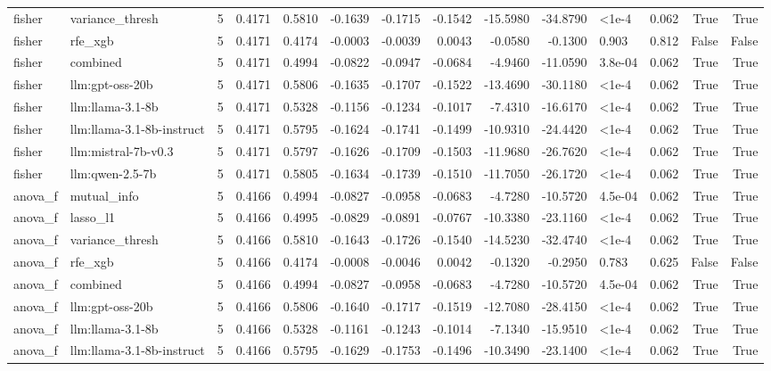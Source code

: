 \begin{tabular}{llrrrrrrrrllrr}
fisher & variance_thresh & 5 & 0.4171 & 0.5810 & -0.1639 & -0.1715 & -0.1542 & -15.5980 & -34.8790 & <1e-4 & 0.062 & True & True \\
fisher & rfe_xgb & 5 & 0.4171 & 0.4174 & -0.0003 & -0.0039 & 0.0043 & -0.0580 & -0.1300 & 0.903 & 0.812 & False & False \\
fisher & combined & 5 & 0.4171 & 0.4994 & -0.0822 & -0.0947 & -0.0684 & -4.9460 & -11.0590 & 3.8e-04 & 0.062 & True & True \\
fisher & llm:gpt-oss-20b & 5 & 0.4171 & 0.5806 & -0.1635 & -0.1707 & -0.1522 & -13.4690 & -30.1180 & <1e-4 & 0.062 & True & True \\
fisher & llm:llama-3.1-8b & 5 & 0.4171 & 0.5328 & -0.1156 & -0.1234 & -0.1017 & -7.4310 & -16.6170 & <1e-4 & 0.062 & True & True \\
fisher & llm:llama-3.1-8b-instruct & 5 & 0.4171 & 0.5795 & -0.1624 & -0.1741 & -0.1499 & -10.9310 & -24.4420 & <1e-4 & 0.062 & True & True \\
fisher & llm:mistral-7b-v0.3 & 5 & 0.4171 & 0.5797 & -0.1626 & -0.1709 & -0.1503 & -11.9680 & -26.7620 & <1e-4 & 0.062 & True & True \\
fisher & llm:qwen-2.5-7b & 5 & 0.4171 & 0.5805 & -0.1634 & -0.1739 & -0.1510 & -11.7050 & -26.1720 & <1e-4 & 0.062 & True & True \\
anova_f & mutual_info & 5 & 0.4166 & 0.4994 & -0.0827 & -0.0958 & -0.0683 & -4.7280 & -10.5720 & 4.5e-04 & 0.062 & True & True \\
anova_f & lasso_l1 & 5 & 0.4166 & 0.4995 & -0.0829 & -0.0891 & -0.0767 & -10.3380 & -23.1160 & <1e-4 & 0.062 & True & True \\
anova_f & variance_thresh & 5 & 0.4166 & 0.5810 & -0.1643 & -0.1726 & -0.1540 & -14.5230 & -32.4740 & <1e-4 & 0.062 & True & True \\
anova_f & rfe_xgb & 5 & 0.4166 & 0.4174 & -0.0008 & -0.0046 & 0.0042 & -0.1320 & -0.2950 & 0.783 & 0.625 & False & False \\
anova_f & combined & 5 & 0.4166 & 0.4994 & -0.0827 & -0.0958 & -0.0683 & -4.7280 & -10.5720 & 4.5e-04 & 0.062 & True & True \\
anova_f & llm:gpt-oss-20b & 5 & 0.4166 & 0.5806 & -0.1640 & -0.1717 & -0.1519 & -12.7080 & -28.4150 & <1e-4 & 0.062 & True & True \\
anova_f & llm:llama-3.1-8b & 5 & 0.4166 & 0.5328 & -0.1161 & -0.1243 & -0.1014 & -7.1340 & -15.9510 & <1e-4 & 0.062 & True & True \\
anova_f & llm:llama-3.1-8b-instruct & 5 & 0.4166 & 0.5795 & -0.1629 & -0.1753 & -0.1496 & -10.3490 & -23.1400 & <1e-4 & 0.062 & True & True \\

\end{tabular}

